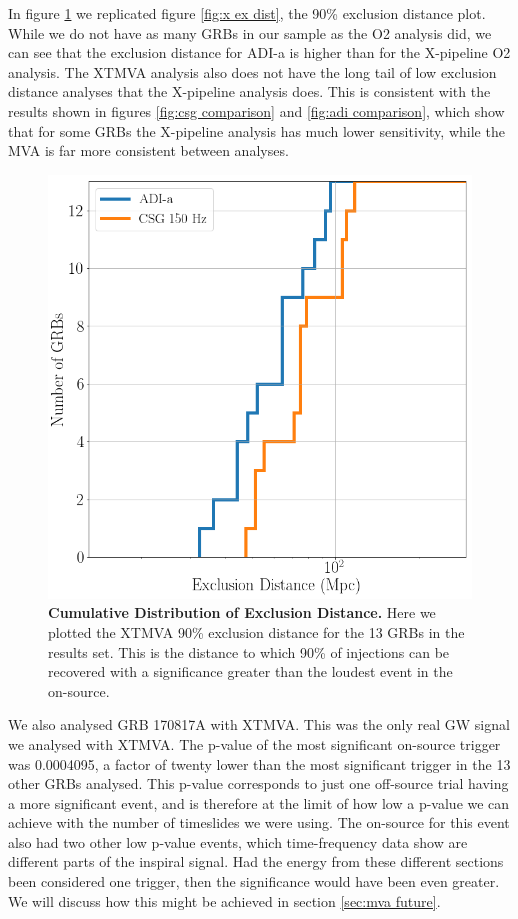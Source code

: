 \documentclass[11pt]{cuthesis}
\newcommand{\xp}{X-pipeline }
\begin{document}
In figure \ref{fig:mva exclusion plot} we replicated figure \ref{fig:x ex dist}, the 90\% exclusion distance plot. While we do not have as many GRBs in our sample as the O2 analysis did, we can see that the exclusion distance for ADI-a is higher than for the \xp O2 analysis. The XTMVA analysis also does not have the long tail of low exclusion distance analyses that the \xp analysis does. This is consistent with the results shown in figures \ref{fig:csg comparison} and \ref{fig:adi comparison}, which show that for some GRBs the \xp analysis has much lower sensitivity, while the MVA is far more consistent between analyses. 

\begin{figure} %
\begin{center}
\includegraphics[width=0.8\linewidth]{mva_exclusion_plot.png}
\end{center}
\caption{\textbf{Cumulative Distribution of Exclusion Distance.} Here we plotted the XTMVA 90\% exclusion distance for the 13 GRBs in the results set. This is the distance to which 90\% of injections can be recovered with a significance greater than the loudest event in the on-source. }
\label{fig:mva exclusion plot}
\end{figure}

We also analysed GRB 170817A with XTMVA. This was the only real GW signal we analysed with XTMVA. The p-value of the most significant on-source trigger was 0.0004095, a factor of twenty lower than the most significant trigger in the 13 other GRBs analysed. This p-value corresponds to just one off-source trial having a more significant event, and is therefore at the limit of how low a p-value we can achieve with the number of timeslides we were using. The on-source for this event also had two other low p-value events, which time-frequency data show are different parts of the inspiral signal. Had the energy from these different sections been considered one trigger, then the significance would have been even greater. We will discuss how this might be achieved in section \ref{sec:mva future}. 
\end{document}
